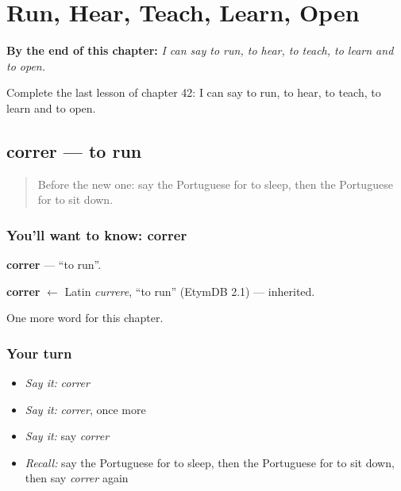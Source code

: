 
\chapter{Run, Hear, Teach, Learn, Open}
\label{ch:pt-run-hear-teach-learn-open}

\begin{chapteropening}
\textbf{By the end of this chapter:} \emph{I can say to run, to hear, to teach, to learn and to open.}

Complete the last lesson of chapter 42: I can say to run, to hear, to teach, to learn and to open.
\end{chapteropening}

\section[correr]{correr — to run}

\label{lesson:PT-C42-correr}



\begin{quote}
Before the new one: say the Portuguese for to sleep, then the Portuguese for to sit down.
\end{quote}

\subsection*{You'll want to know: correr}
\textbf{correr} — \textquotedblleft{}to run\textquotedblright{}.

\begin{cousinweb}
\textbf{correr} $\leftarrow$ Latin \emph{currere}, \textquotedblleft{}to run\textquotedblright{} (EtymDB 2.1) — inherited.
\end{cousinweb}

\begin{grammarlens}[title={What you've built}]
One more word for this chapter.
\end{grammarlens}

\subsection*{Your turn}
\begin{itemize}
\raggedright
  \item \emph{Say it:} \emph{correr}
  \item \emph{Say it:} \emph{correr}, once more
  \item \emph{Say it:} say \emph{correr}
  \item \emph{Recall:} say the Portuguese for to sleep, then the Portuguese for to sit down, then say \emph{correr} again
\end{itemize}

